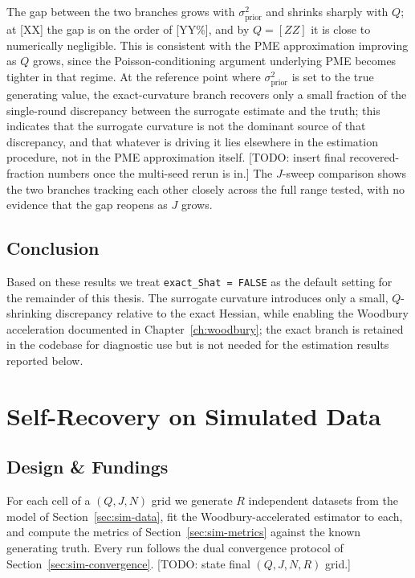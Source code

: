 The gap between the two branches grows with $\sigma^2_{\mathrm{prior}}$ and shrinks sharply with $Q$; at [XX] the gap is on the order of [YY\%], and by $Q = [ZZ]$ it is close to numerically negligible. This is consistent with the PME approximation improving as $Q$ grows, since the Poisson-conditioning argument underlying PME becomes tighter in that regime. At the reference point where $\sigma^2_{\mathrm{prior}}$ is set to the true generating value, the exact-curvature branch recovers only a small fraction of the single-round discrepancy between the surrogate estimate and the truth; this indicates that the surrogate curvature is not the dominant source of that discrepancy, and that whatever is driving it lies elsewhere in the estimation procedure, not in the PME approximation itself. [TODO: insert final recovered-fraction numbers once the multi-seed rerun is in.] The $J$-sweep comparison shows the two branches tracking each other closely across the full range tested, with no evidence that the gap reopens as $J$ grows.



\subsection{Conclusion}

Based on these results we treat \texttt{exact\_Shat = FALSE} as the default setting for the remainder of this thesis. The surrogate curvature introduces only a small, $Q$-shrinking discrepancy relative to the exact Hessian, while enabling the Woodbury acceleration documented in Chapter~\ref{ch:woodbury}; the exact branch is retained in the codebase for diagnostic use but is not needed for the estimation results reported below.


\section{Self-Recovery on Simulated Data}
\label{sec:sim-recovery}

\subsection{Design \& Fundings}

For each cell of a $(Q, J, N)$ grid we generate $R$ independent datasets from the model of Section~\ref{sec:sim-data}, fit the Woodbury-accelerated estimator to each, and compute the metrics of Section~\ref{sec:sim-metrics} against the known generating truth. Every run follows the dual convergence protocol of Section~\ref{sec:sim-convergence}. [TODO: state final $(Q,J,N,R)$ grid.]

